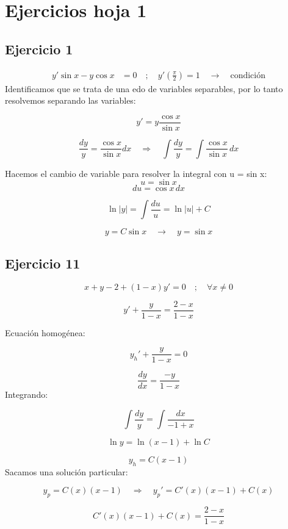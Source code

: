 \documentclass[a4paper,12pt]{article}
\begin{document}
\newpage
\section{Ejercicios hoja 1}

\subsection{Ejercicio 1}
\vspace{-1.2em}
\[
\begin{aligned}
y' \sin x - y \cos x &= 0 
\quad ;\quad 
y'\!\left( \frac{\pi}{2} \right) = 1 \quad \rightarrow \quad \text{condición}
\end{aligned}
\]
Identificamos que se trata de una edo de variables separables, por lo tanto resolvemos 
separando las variables:

\[
y' = y \frac{\cos x}{\sin x}
\]

\[
\frac{dy}{y} = \frac{\cos x}{\sin x}dx
\quad \Rightarrow \quad
\int \frac{dy}{y} = \int \frac{\cos x}{\sin x}\, dx
\]

\medskip
\noindent
Hacemos el cambio de variable para resolver la integral con u = sin x:
\[
u = \sin x
\]
\[
du = \cos x\, dx
\]

\[
\ln |y| = \int \frac{du}{u} = \ln |u| + C
\]

\[
y = C \sin x \quad \rightarrow \quad y = \sin x
\]

\subsection{Ejercicio 11}
\vspace{-1.2em}
\[
x + y - 2 + (1 - x) y' = 0 \quad ; \quad \forall x \neq 0
\]

\[
y' + \frac{y}{1 - x} = \frac{2 - x}{1 - x}
\]

Ecuación homogénea:

\[
y_h' + \frac{y}{1 - x} = 0
\]

\[
\frac{dy}{dx} = \frac{-y}{1 - x}
\]
\newpage
\noindent
Integrando:

\[
\int \frac{dy}{y} = \int \frac{dx}{-1 + x}
\]

\[
\ln y = \ln(x - 1) + \ln C
\]

\[
y_h = C (x - 1)
\]
Sacamos una solución particular:

\[
y_p = C(x)(x - 1) \quad \Rightarrow \quad y_p' = C'(x)(x - 1) + C(x)
\]

\[
C'(x)(x - 1) + C(x) = \frac{2 - x}{1 - x}
\]
\end{document}
